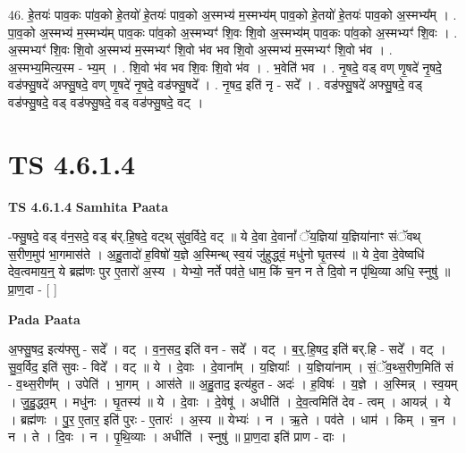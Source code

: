 \documentclass[17pt]{extarticle}
\begin{document}
46. हे॒तयः॑ पाव॒कः पा॑व॒को हे॒तयो॑ हे॒तयः॑ पाव॒को अ॒स्मभ्य॑ म॒स्मभ्य॑म् पाव॒को हे॒तयो॑ हे॒तयः॑ पाव॒को अ॒स्मभ्य᳚म् । . पा॒व॒को अ॒स्मभ्य॑ म॒स्मभ्य॑म् पाव॒कः पा॑व॒को अ॒स्मभ्यꣳ॑ शि॒वः शि॒वो अ॒स्मभ्य॑म् पाव॒कः पा॑व॒को अ॒स्मभ्यꣳ॑ शि॒वः । . अ॒स्मभ्यꣳ॑ शि॒वः शि॒वो अ॒स्मभ्य॑ म॒स्मभ्यꣳ॑ शि॒वो भ॑व भव शि॒वो अ॒स्मभ्य॑ म॒स्मभ्यꣳ॑ शि॒वो भ॑व । . अ॒स्मभ्य॒मित्य॒स्म - भ्य॒म् । . शि॒वो भ॑व भव शि॒वः शि॒वो भ॑व । . भ॒वेति॑ भव । . नृ॒षदे॒ वड् वण् णृ॒षदे॑ नृ॒षदे॒ वड॑फ्सु॒षदे॑ अफ्सु॒षदे॒ वण् णृ॒षदे॑ नृ॒षदे॒ वड॑फ्सु॒षदे᳚ । . नृ॒षद॒ इति॑ नृ - सदे᳚ । . वड॑फ्सु॒षदे॑ अफ्सु॒षदे॒ वड् वड॑फ्सु॒षदे॒ वड् वड॑फ्सु॒षदे॒ वड् वड॑फ्सु॒षदे॒ वट् । \newline
\pagebreak
{}

\section{ TS 4.6.1.4 }

\textbf{TS 4.6.1.4 } \newline
\textbf{Samhita Paata} \newline

-फ्सु॒षदे॒ वड् व॑न॒सदे॒ वड् ब॑र्.हि॒षदे॒ वट्थ् सु॑व॒र्विदे॒ वट् ॥ ये दे॒वा दे॒वानां᳚ ॅय॒ज्ञिया॑ य॒ज्ञिया॑नाꣳ संॅवथ् स॒रीण॒मुप॑ भा॒गमास॑ते । अ॒हु॒तादो॑ ह॒विषो॑ य॒ज्ञे अ॒स्मिन्थ् स्व॒यं जु॑हुद्ध्वं॒ मधु॑नो घृ॒तस्य॑ ॥ ये दे॒वा दे॒वेष्वधि॑ देव॒त्वमाय॒न्॒ ये ब्रह्म॑णः पुर ए॒तारो॑ अ॒स्य । येभ्यो॒ नर्ते पव॑ते॒ धाम॒ किं च॒न न ते दि॒वो न पृ॑थि॒व्या अधि॒ स्नुषु॑ ॥ प्रा॒ण॒दा - [  ] \newline

\textbf{Pada Paata} \newline

अ॒फ्सु॒षद॒ इत्य॑फ्सु - सदे᳚ । वट् । व॒न॒सद॒ इति॑ वन - सदे᳚ । वट् । ब॒र्॒.हि॒षद॒ इति॑ बर्.हि - सदे᳚ । वट् । सु॒व॒र्विद॒ इति॑ सुवः - विदे᳚ । वट् ॥ ये । दे॒वाः । दे॒वाना᳚म् । य॒ज्ञियाः᳚ । य॒ज्ञिया॑नाम् । सं॒ॅव॒थ्स॒रीण॒मिति॑ सं - व॒थ्स॒रीण᳚म् । उपेति॑ । भा॒गम् । आस॑ते ॥ अ॒हु॒ताद॒ इत्य॑हुत - अदः॑ । ह॒विषः॑ । य॒ज्ञे । अ॒स्मिन्न् । स्व॒यम् । जु॒हु॒द्ध्व॒म् । मधु॑नः । घृ॒तस्य॑ ॥ ये । दे॒वाः । दे॒वेषू॑ । अधीति॑ । दे॒व॒त्वमिति॑ देव - त्वम् । आयन्न्॑ । ये । ब्रह्म॑णः । पु॒र॒ ए॒तार॒ इति॑ पुरः - ए॒तारः॑ । अ॒स्य ॥ येभ्यः॑ । न । ऋ॒ते । पव॑ते । धाम॑ । किम् । च॒न । न । ते । दि॒वः । न । पृ॒थि॒व्याः । अधीति॑ । स्नुषु॑ ॥ प्रा॒ण॒दा इति॑ प्राण - दाः ।  \newline
\end{document}
